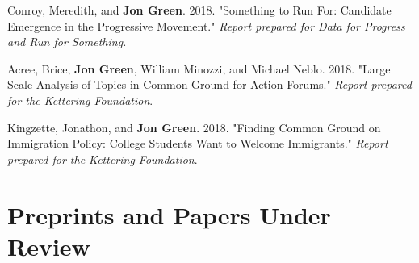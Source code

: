 \documentclass[letterpaper]{article}
\renewenvironment{itemize}{
  \begin{list}{}{
    \setlength{\leftmargin}{1.5em}
  }
}{
  \end{list}
}
\begin{document}
\begin{itemize}
\item Conroy, Meredith, and \textbf{Jon Green}. 2018. "Something to Run For: Candidate Emergence in the Progressive Movement." \textit{Report prepared for Data for Progress and Run for Something.}

\item Acree, Brice, \textbf{Jon Green}, William Minozzi, and Michael Neblo. 2018. "Large Scale Analysis of Topics in Common Ground for Action Forums." \textit{Report prepared for the Kettering Foundation}.

\item Kingzette, Jonathon, and \textbf{Jon Green}. 2018. "Finding Common Ground on Immigration Policy: College Students Want to Welcome Immigrants." \textit{Report prepared for the Kettering Foundation}.
\end{itemize}

\section*{Preprints and Papers Under Review}
\end{document}

